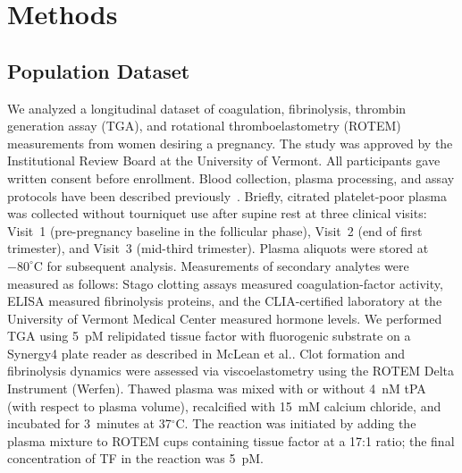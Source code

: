 \section{Methods}
\label{sec:methods}

\subsection{Population Dataset}
\label{sec:dataset}
We analyzed a longitudinal dataset of coagulation, fibrinolysis, thrombin generation
assay (TGA), and rotational thromboelastometry (ROTEM) measurements from women
desiring a pregnancy. The study was approved by the Institutional Review Board at
the University of Vermont. All participants gave written consent before enrollment.
Blood collection, plasma processing, and assay protocols have been described
previously~\citep{McLean2012TGA,Hale2012,Psoinos2021,Bernstein2016}. Briefly, citrated platelet-poor plasma
was collected without tourniquet use after supine rest at three clinical visits:
Visit~1 (pre-pregnancy baseline in the follicular phase), Visit~2 (end of first
trimester), and Visit~3 (mid-third trimester). Plasma aliquots were stored at
$-80^{\circ}$C for subsequent analysis. Measurements of secondary analytes were
measured as follows: Stago clotting assays measured coagulation-factor activity, ELISA
measured fibrinolysis proteins, and the CLIA-certified laboratory at the University of Vermont
Medical Center measured hormone levels. We performed TGA using 5~pM relipidated tissue factor with
fluorogenic substrate on a Synergy4 plate reader as described
in McLean et al.\citep{McLean2012TGA}. Clot formation and fibrinolysis dynamics were assessed via
viscoelastometry using the ROTEM Delta Instrument (Werfen). Thawed plasma was mixed
with or without 4~nM tPA (with respect to plasma volume), recalcified with 15~mM
calcium chloride, and incubated for 3~minutes at 37$^{\circ}$C. The reaction was
initiated by adding the plasma mixture to ROTEM cups containing tissue factor at a
17:1 ratio; the final concentration of TF in the reaction was 5~pM.

